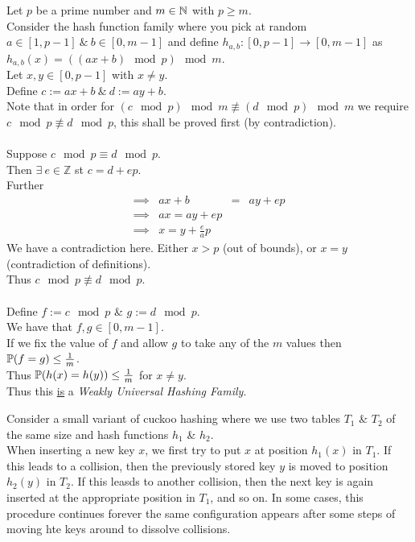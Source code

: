 \documentclass[11pt,a4paper]{article}
\begin{document}
\qpart
Let $p$ be a prime number and $m\in\mathbb{N}$ with $p\geq m$.\\
Consider the hash function family where you pick at random $a\in[1,p-1]\ \&\ b\in[0,m-1]$ and define $h_{a,b}:[0,p-1]\to[0,m-1]$ as $h_{a,b}(x)=((ax+b)\mod p)\mod m$.\\

\apart
Let $x,y\in[0,p-1]$ with $x\neq y$.\\
Define $c:=ax+b\ \&\ d:=ay+b$.\\
Note that in order for $(c\mod p)\mod m\not\equiv(d\mod p)\mod m$ we require ${c\mod p\not\equiv d\mod p}$, this shall be proved first (by contradiction).\\
\\
Suppose $c\mod p\equiv d\mod p$.\\
Then $\exists\ e\in\mathbb{Z}$ st $c=d+ep$.\\
Further
\[\begin{array}{rrcl}
\implies&ax+b&=&ay+ep\\
\implies&ax=ay+ep\\
\implies&x=y+\frac{e}{a}p
\end{array}\]
We have a contradiction here. Either $x>p$ (out of bounds), or $x=y$ (contradiction of definitions).\\
Thus $c\mod p\not\equiv d\mod p$.\\
\\
Define $f:=c\mod p$ \& $g:=d\mod p$.\\
We have that $f,g\in[0,m-1]$.\\
If we fix the value of $f$ and allow $g$ to take any of the $m$ values then $\mathbb{P}(f=g)\leq\frac1m$.\\
Thus $\mathbb{P}(h(x)=h(y))\leq\frac1m$ for $x\neq y$.\\
Thus this \underline{is} a \textit{Weakly Universal Hashing Family}.\proved

\question
Consider a small variant of cuckoo hashing where we use two tables $T_1$ \& $T_2$ of the same size and hash functions $h_1$ \& $h_2$.\\
When inserting a new key $x$, we first try to put $x$ at position $h_1(x)$ in $T_1$. If this leads to a collision, then the previously stored key $y$ is moved to position $h_2(y)$ in $T_2$. If this leasds to another collision, then the next key is again inserted at the appropriate position in $T_1$, and so on. In some cases, this procedure continues forever \ie the same configuration appears after some steps of moving hte keys around to dissolve collisions.\\
\end{document}
